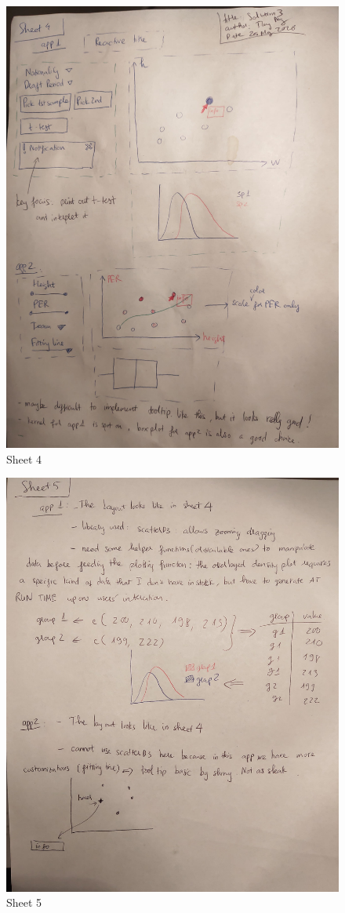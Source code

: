 \documentclass[a4paper,12pt,twoside]{article}
\numberwithin{equation}{section}
\begin{document}
\begin{figure}[h]
\caption{Sheet 4}
\includegraphics[scale=0.15]{o4.jpg}
\centering
\end{figure}

\begin{figure}[h]
\caption{Sheet 5}
\includegraphics[scale=0.15]{o2.jpg}
\centering
\end{figure}
\end{document}
